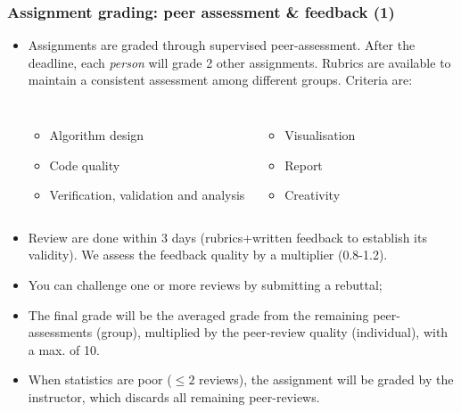 \begin{frame}
  \frametitle{Assignment grading: peer assessment \& feedback (1)}
  \begin{itemize}
    \item Assignments are graded through supervised peer-assessment. After the deadline, each \emph{person} will grade 2 other assignments. Rubrics are available to maintain a consistent assessment among different groups. Criteria are:\hfill
      \begin{columns}
          \begin{itemize}
            \item Algorithm design
            \item Code quality
            \item Verification, validation and analysis
          \end{itemize}
          \begin{itemize}
            \item Visualisation
            \item Report
            \item Creativity
          \end{itemize}
      \end{columns}
    \item Review are done within 3 days (rubrics+written feedback to establish its validity). We assess the feedback quality by a multiplier (0.8-1.2).
    \item You can challenge one or more reviews by submitting a rebuttal;
    \item The final grade will be the averaged grade from the remaining peer-assessments (group), multiplied by the peer-review quality (individual), with a max. of 10.
    \item When statistics are poor ($\leq 2$ reviews), the assignment will be graded by the instructor, which discards all remaining peer-reviews.
  \end{itemize}
\end{frame}

